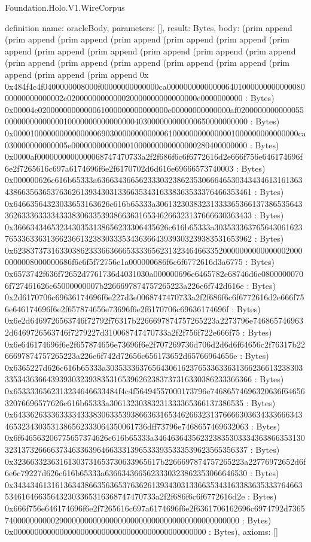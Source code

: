 \begin{lexlean}{Foundation.Holo.V1.WireCorpus}
\begin{semanticmodule}
definition{
  name: oracleBody,
  parameters: [],
  result: Bytes,
  body: (prim append (prim append (prim append (prim append (prim append (prim append (prim append (prim append (prim append (prim append (prim append (prim append (prim append (prim append (prim append (prim append (prim append (prim append (prim append (prim append 0x 0x484f4c4f0400000008000f00000000000000ca00000000000000640100000000000008000000000000002e0200000000000020000000000000000e0000000000 : Bytes) 0x00004e0200000000000061000000000000000e00000000000000af02000000000000550000000000000010000000000000000403000000000000650000000000 : Bytes) 0x00001000000000000000690300000000000061000000000000001000000000000000ca030000000000005e000000000000001000000000000000280400000000 : Bytes) 0x0000af0000000000000068747470733a2f2f686f6c6f6772616d2e666f756e646174696f6e2f7265616c697a6174696f6e2f6170702d6d616e69666573740003 : Bytes) 0x000000626c616b65333a636634366562333032386235306664653034343461316136343866356365376362613934303133663534316338363533376466353461 : Bytes) 0x64663564323033653163626c616b65333a3061323038323133336536613738653564336263336333343338306335393866363165346266323137666630363433 : Bytes) 0x3666343465323430353138656233306435626c616b65333a30353336376564306162376533633631366236613238303335343636643939303239383531653962 : Bytes) 0x6238373731633038623336636665333365623132346466335200000000000000020000000008000000686f6c6f5f72756e1a000000686f6c6f6772616d3a6775 : Bytes) 0x6573742f636f72652d7761736d4031030a000000696e6465782e68746d6c08000000706f727461626c65000000007b2266697874757265223a226e6f742d616e : Bytes) 0x2d6170706c69636174696f6e227d3e0068747470733a2f2f686f6c6f6772616d2e666f756e646174696f6e2f657874656e73696f6e2f6170706c69636174696f : Bytes) 0x6e2d6469726563746f72792f76317b2266697874757265223a2273796e7468657469632d6469726563746f7279227d310068747470733a2f2f756f722e666f75 : Bytes) 0x6e646174696f6e2f657874656e73696f6e2f707269736d706d2d6d6f64656c2f76317b2266697874757265223a226e6f742d72656c656173652d65766964656e : Bytes) 0x6365227d626c616b65333a3035333637656430616237653363363136623661323830333534363664393930323938353165396262383737316330386233366366 : Bytes) 0x6533336562313234646633484f4c4f56494557000173796e74686574696320636f6465632076696577626c616b65333a30613230383231333365366137386535 : Bytes) 0x6433626333633334333830633539386636316534626632313766663036343336663434653234303531386562333064350061736dff73796e7468657469632063 : Bytes) 0x6f646563206775657374626c616b65333a3464636435623238353033343638663531303231373266663734633639646633313965333935333539623565356337 : Bytes) 0x32366332363161303731653730633965617b2266697874757265223a22776972652d6f6e6c79227d626c616b65333a6366343665623330323862353066646530 : Bytes) 0x343434613161363438663563653763626139343031336635343163383635333764663534616466356432303365316368747470733a2f2f686f6c6f6772616d2e : Bytes) 0x666f756e646174696f6e2f7265616c697a6174696f6e2f6361706162696c6974792d736574000000000029000000000000000000000000000000000000000000 : Bytes) 0x0000000000000000000000000000000000000000000000 : Bytes),
  axioms: []
}


\end{semanticmodule}
\end{lexlean}
